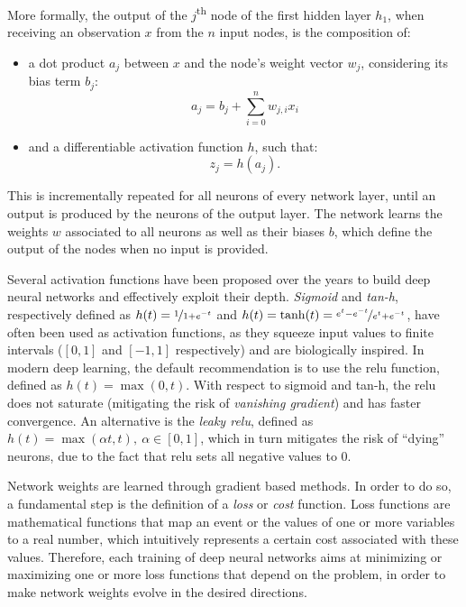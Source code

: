 \documentclass[%
    corpo=12pt,
    twoside,
    stile=classica,   
    tipotesi=magistrale,
    evenboxes,
    english,
	numerazioneromana,
]{toptesi}
\newcommand{\quotes}[1]{``#1''}
\begin{document}
\bigskip
More formally, the output of the $j$\textsuperscript{th} node of the first hidden layer $h_1$, when receiving an observation $x$ from the $n$ input nodes, is the composition of:
\begin{itemize}
	\item a dot product $a_j$ between $x$ and the node's weight vector $w_j$, considering its bias term $b_j$:
	\begin{equation*}
		a_j = b_j + \sum_{i=0}^n w_{j,i}x_i
	\end{equation*}
	\item and a differentiable activation function $h$, such that:
	\begin{equation*}
		z_j = h(a_j)\text{.}
	\end{equation*}
\end{itemize}
This is incrementally repeated for all neurons of every network layer, until an output is produced by the neurons of the output layer. The network learns the weights $w$ associated to all neurons as well as their biases $b$, which define the output of the nodes when no input is provided\cite{amini2015apprentissage}.

\bigskip
Several activation functions have been proposed over the years to build deep neural networks and effectively exploit their depth. \textit{Sigmoid} and \textit{tan-h}, respectively defined as $h(t) = \nicefrac{1}{1 + e^{-t}}$ and $h(t) = \tanh(t) = \nicefrac{e^t - e^{-t}}{e^t + e^{-t}}$, have often been used as activation functions, as they squeeze input values to finite intervals ($[0,1]$ and $[-1,1]$ respectively) and are biologically inspired. In modern deep learning, the default recommendation is to use the \gls{relu} function, defined as $h(t) = \max(0,t)$. With respect to sigmoid and tan-h, the \gls{relu} does not saturate (mitigating the risk of \textit{vanishing gradient}) and has faster convergence. An alternative is the \textit{leaky \gls{relu}}, defined as $h(t) = \max(\alpha t, t),\ \alpha \in [0,1]$, which in turn mitigates the risk of \quotes{dying} neurons, due to the fact that \gls{relu} sets all negative values to $0$.

\bigskip
Network weights are learned through gradient based methods. In order to do so, a fundamental step is the definition of a \textit{loss} or \textit{cost} function. Loss functions are mathematical functions that map an event or the values of one or more variables to a real number, which intuitively represents a certain cost associated with these values. Therefore, each training of deep neural networks aims at minimizing or maximizing one or more loss functions that depend on the problem, in order to make network weights evolve in the desired directions. 
\end{document}
